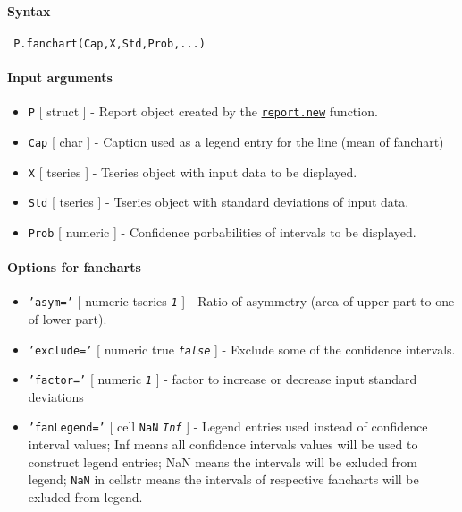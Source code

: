 


	\paragraph{Syntax}
 
 \begin{verbatim}
 P.fanchart(Cap,X,Std,Prob,...)
 \end{verbatim}
 
 \paragraph{Input arguments}
 
 \begin{itemize}
 \item
   \texttt{P} {[} struct {]} - Report object created by the
   \href{report/new}{\texttt{report.new}} function.
 \item
   \texttt{Cap} {[} char {]} - Caption used as a legend entry for the
   line (mean of fanchart)
 \item
   \texttt{X} {[} tseries {]} - Tseries object with input data to be
   displayed.
 \item
   \texttt{Std} {[} tseries {]} - Tseries object with standard deviations
   of input data.
 \item
   \texttt{Prob} {[} numeric {]} - Confidence porbabilities of intervals
   to be displayed.
 \end{itemize}
 
 \paragraph{Options for fancharts}
 
 \begin{itemize}
 \item
   \texttt{'asym='} {[} numeric \textbar{} tseries \textbar{}
   \emph{\texttt{1}} {]} - Ratio of asymmetry (area of upper part to one
   of lower part).
 \item
   \texttt{'exclude='} {[} numeric \textbar{} true \textbar{}
   \emph{\texttt{false}} {]} - Exclude some of the confidence intervals.
 \item
   \texttt{'factor='} {[} numeric \textbar{} \emph{\texttt{1}} {]} -
   factor to increase or decrease input standard deviations
 \item
   \texttt{'fanLegend='} {[} cell \textbar{} \texttt{NaN} \textbar{}
   \emph{\texttt{Inf}} {]} - Legend entries used instead of confidence
   interval values; Inf means all confidence intervals values will be
   used to construct legend entries; NaN means the intervals will be
   exluded from legend; \texttt{NaN} in cellstr means the intervals of
   respective fancharts will be exluded from legend.
 \end{itemize}
 
